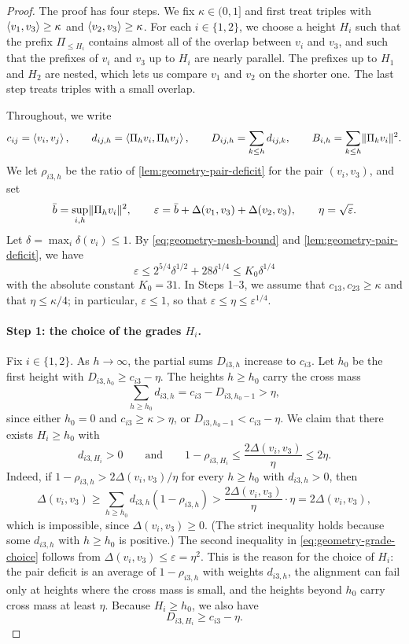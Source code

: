 \begin{proof}
The proof has four steps. We fix $\kappa\in(0,1]$ and first treat triples with $\left\langle v_1,v_3\right\rangle\ge\kappa$ and $\left\langle v_2,v_3\right\rangle\ge\kappa$. For each $i\in\{1,2\}$, we choose a height $H_i$ such that the prefix $\Pi_{\le H_i}$ contains almost all of the overlap between $v_i$ and $v_3$, and such that the prefixes of $v_i$ and $v_3$ up to $H_i$ are nearly parallel. The prefixes up to $H_1$ and $H_2$ are nested, which lets us compare $v_1$ and $v_2$ on the shorter one. The last step treats triples with a small overlap.

Throughout, we write
\[
 c_{ij}=\left\langle v_i,v_j\right\rangle,\qquad d_{ij,h}=\left\langle\Pi_hv_i,\Pi_hv_j\right\rangle,\qquad
 D_{ij,h}=\sum_{k\le h}d_{ij,k},\qquad B_{i,h}=\sum_{k\le h}\lVert\Pi_kv_i\rVert^2 .
\]
We let $\rho_{i3,h}$ be the ratio of \cref{lem:geometry-pair-deficit} for the pair $(v_i,v_3)$, and set
\[
 \bar b=\sup_{i,h}\lVert\Pi_hv_i\rVert^2,\qquad
 \varepsilon=\bar b+\Delta(v_1,v_3)+\Delta(v_2,v_3),\qquad \eta=\sqrt\varepsilon .
\]
Let $\delta=\max_i\delta(v_i)\le1$. By \eqref{eq:geometry-mesh-bound} and \cref{lem:geometry-pair-deficit}, we have
\begin{equation}\label{eq:geometry-triple-epsilon}
 \varepsilon\le2^{5/4}\delta^{1/2}+28\delta^{1/4}\le K_0\delta^{1/4}
\end{equation}
with the absolute constant $K_0=31$. In Steps 1--3, we assume that $c_{13},c_{23}\ge\kappa$ and that $\eta\le\kappa/4$; in particular, $\varepsilon\le1$, so that $\varepsilon\le\eta\le\varepsilon^{1/4}$.

\paragraph{Step 1: the choice of the grades $H_i$.}
Fix $i\in\{1,2\}$. As $h\to\infty$, the partial sums $D_{i3,h}$ increase to $c_{i3}$. Let $h_0$ be the first height with $D_{i3,h_0}\ge c_{i3}-\eta$. The heights $h\ge h_0$ carry the cross mass
\[
 \sum_{h\ge h_0}d_{i3,h}=c_{i3}-D_{i3,h_0-1}>\eta,
\]
since either $h_0=0$ and $c_{i3}\ge\kappa>\eta$, or $D_{i3,h_0-1}<c_{i3}-\eta$. We claim that there exists $H_i\ge h_0$ with
\begin{equation}\label{eq:geometry-grade-choice}
 d_{i3,H_i}>0\qquad\text{and}\qquad 1-\rho_{i3,H_i}\le\frac{2\Delta(v_i,v_3)}\eta\le2\eta .
\end{equation}
Indeed, if $1-\rho_{i3,h}>2\Delta(v_i,v_3)/\eta$ for every $h\ge h_0$ with $d_{i3,h}>0$, then
\[
 \Delta(v_i,v_3)\ge\sum_{h\ge h_0}d_{i3,h}(1-\rho_{i3,h})>\frac{2\Delta(v_i,v_3)}\eta\cdot\eta=2\Delta(v_i,v_3),
\]
which is impossible, since $\Delta(v_i,v_3)\ge0$. (The strict inequality holds because some $d_{i3,h}$ with $h\ge h_0$ is positive.) The second inequality in \eqref{eq:geometry-grade-choice} follows from $\Delta(v_i,v_3)\le\varepsilon=\eta^2$. This is the reason for the choice of $H_i$: the pair deficit is an average of $1-\rho_{i3,h}$ with weights $d_{i3,h}$, the alignment can fail only at heights where the cross mass is small, and the heights beyond $h_0$ carry cross mass at least $\eta$. Because $H_i\ge h_0$, we also have
\begin{equation}\label{eq:geometry-grade-mass}
 D_{i3,H_i}\ge c_{i3}-\eta .
\end{equation}


\end{proof}
